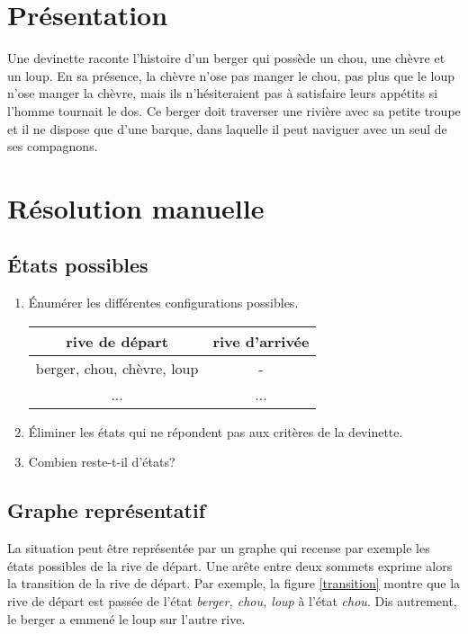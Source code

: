 \documentclass[a4paper,11pt]{article}
\begin{document}
\begin{Form}
\section{Présentation}
Une devinette raconte l’histoire d’un berger qui possède un chou, une chèvre et un loup. En sa présence, la chèvre n’ose pas manger le chou, pas plus que le loup n’ose manger la chèvre, mais ils n’hésiteraient pas à satisfaire leurs appétits si l’homme tournait le dos. Ce berger doit traverser une rivière avec sa petite troupe et il ne dispose que d’une barque, dans laquelle il peut naviguer avec un seul de ses compagnons.
\begin{center}
\end{center}
\section{Résolution manuelle}
\subsection{États possibles}
\begin{activite}
\begin{enumerate}
\item Énumérer les différentes configurations possibles.

\begin{tabular}{|c|c|}
\hline 
rive de départ & rive d'arrivée \\ 
\hline 
berger, chou, chèvre, loup & - \\ 
\hline 
... & ... \\ 
\hline 
\end{tabular} 
\item Éliminer les états qui ne répondent pas aux critères de la devinette.
\item Combien reste-t-il d'états?
\end{enumerate}
\end{activite}
\subsection{Graphe représentatif}
La situation peut être représentée par un graphe qui recense par exemple les états possibles de la rive de départ. Une arête entre deux sommets exprime alors la transition de la rive de départ. Par exemple, la figure \ref{transition} montre que la rive de départ est passée de l'état  \emph{berger, chou, loup} à l'état \emph{chou}. Dis autrement, le berger a emmené le loup sur l'autre rive.
\begin{center}
\end{center}
\end{Form}
\end{document}
